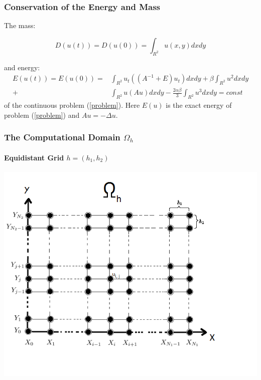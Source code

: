 \documentclass{beamer}
\newcommand{\rf}[1]{(\ref{#1})}
\begin{document}
\begin{frame}
\frametitle{Conservation of the Energy and Mass}
The mass:

\begin{equation}\label{int}
D(u(t))=D(u(0))=\int_{R^2} u(x,y)dx dy
\end{equation}

and energy:
\begin{align}\label{ex-en}
E(u(t)) = E(u(0)) =&\int_{R^2} u_t \left((A^{-1}+E)u_t\right) dxdy+
\beta \int_{R^2} u^2 dxdy \nonumber\\
+& \int_{R^2}u \left(A u\right) dxdy
-\frac{2 \alpha \beta}{3} \int_{R^2} u^3 dxdy =const
\end{align}
of the continuous problem \rf{problem}. Here $E(u)$ is the exact energy of problem \rf{problem} and $Au=-\Delta u$.
\end{frame}


\begin{frame}
\frametitle{The Computational Domain $\Omega_h$}
\framesubtitle{Equidistant Grid $h=(h_1, h_2)$}
\begin{center}\vspace{0.4cm}
	\begin{minipage}[b]{0.6\linewidth}
		\includegraphics[width=\linewidth]{Omega_dah.png}
	\end{minipage}
\end{center}

\end{frame}
\end{document}
